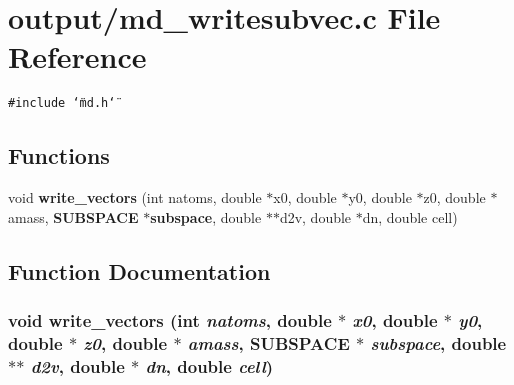 \section{output/md\_\-writesubvec.c File Reference}
\label{md__writesubvec_8c}
{\tt \#include \char`\"{}md.h\char`\"{}}\par
\subsection*{Functions}
\begin{CompactItemize}
\item 
void {\bf write\_\-vectors} (int natoms, double $\ast$x0, double $\ast$y0, double $\ast$z0, double $\ast$amass, {\bf SUBSPACE} $\ast${\bf subspace}, double $\ast$$\ast$d2v, double $\ast$dn, double cell)
\end{CompactItemize}


\subsection{Function Documentation}
\subsubsection{\setlength{\rightskip}{0pt plus 5cm}void write\_\-vectors (int {\em natoms}, double $\ast$ {\em x0}, double $\ast$ {\em y0}, double $\ast$ {\em z0}, double $\ast$ {\em amass}, {\bf SUBSPACE} $\ast$ {\em subspace}, double $\ast$$\ast$ {\em d2v}, double $\ast$ {\em dn}, double {\em cell})}\label{md__writesubvec_8c_663838f830b138889cd8eb3fb1fa451a}


